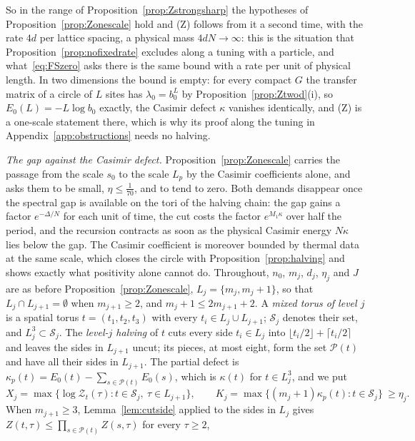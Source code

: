 So in the range of Proposition~\ref{prop:Zstrongsharp} the hypotheses of
Proposition~\ref{prop:Zonescale} hold and (Z) follows from it a second
time, with the rate $4d$ per lattice spacing, a physical mass $4dN\to\infty$:
this is the situation that Proposition~\ref{prop:nofixedrate} excludes
along a tuning with a particle, and what~\eqref{eq:FSzero} asks there is the
same bound with a rate per unit of physical length. In two dimensions the
bound is empty: for every compact $G$ the transfer matrix of a circle of
$L$ sites has $\lambda_0=b_0^L$ by Proposition~\ref{prop:Ztwod}(i), so
$E_0(L)=-L\log b_0$ exactly, the Casimir defect $\kappa$ vanishes
identically, and (Z) is a one-scale statement there, which is why its proof
along the tuning in Appendix~\ref{app:obstructions} needs no halving.

\emph{The gap against the Casimir defect.} Proposition~\ref{prop:Zonescale}
carries the passage from the scale $s_0$ to the scale $L_p$ by the Casimir
coefficients alone, and asks them to be small, $\eta\le\frac1{70}$, and to
tend to zero. Both demands disappear once the spectral gap is available on
the tori of the halving chain: the gap gains a factor $e^{-\Delta/N}$ for
each unit of time, the cut costs the factor $e^{M_1\kappa}$ over half the
period, and the recursion contracts as soon as the physical Casimir energy
$N\kappa$ lies below the gap. The Casimir coefficient is moreover bounded by
thermal data at the same scale, which closes the circle with
Proposition~\ref{prop:halving} and shows exactly what positivity alone
cannot do. Throughout, $n_0$, $m_j$, $d_j$, $\eta_j$ and $J$ are as before
Proposition~\ref{prop:Zonescale}, $L_j=\{m_j,m_j+1\}$, so that $L_j\cap
L_{j+1}=\emptyset$ when $m_{j+1}\ge2$, and $m_j+1\le2m_{j+1}+2$. A
\emph{mixed torus of level $j$} is a spatial torus $t=(t_1,t_2,t_3)$ with
every $t_i\in L_j\cup L_{j+1}$; $\mathcal S_j$ denotes their set, and
$L_j^3\subset\mathcal S_j$. The \emph{level-$j$ halving} of $t$ cuts every
side $t_i\in L_j$ into $\lfloor t_i/2\rfloor+\lceil t_i/2\rceil$ and leaves
the sides in $L_{j+1}$ uncut; its pieces, at most eight, form the set
$\mathcal P(t)$ and have all their sides in $L_{j+1}$. The partial defect
is $\kappa_p(t)=E_0(t)-\sum_{s\in\mathcal P(t)}E_0(s)$, which is
$\kappa(t)$ for $t\in L_j^3$, and we put
\[
X_j=\max\bigl\{\log\mathcal Z_t(\tau):t\in\mathcal S_j,\ \tau\in L_{j+1}
\bigr\},\qquad
K_j=\max\bigl\{(m_j+1)\kappa_p(t):t\in\mathcal S_j\bigr\}\ \ge\eta_j .
\]
When $m_{j+1}\ge3$, Lemma~\ref{lem:cutside} applied to the sides in $L_j$
gives $Z(t,\tau)\le\prod_{s\in\mathcal P(t)}Z(s,\tau)$ for every $\tau\ge2$,
